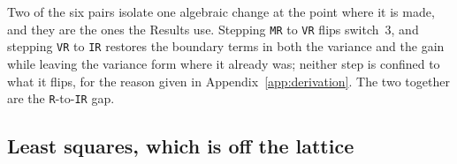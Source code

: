 \begin{appendixbox}
Two of the six pairs isolate one algebraic change at the point where it is made, and they are
the ones the Results use. Stepping \texttt{MR} to \texttt{VR} flips switch~3, and stepping
\texttt{VR} to \texttt{IR} restores the boundary terms in both the variance and the gain
while leaving the variance form where it already was; neither step is confined to what it
flips, for the reason given in Appendix~\ref{app:derivation}. The two together are the
\texttt{R}-to-\texttt{IR} gap.

\subsection*{Least squares, which is off the lattice}


\end{appendixbox}
